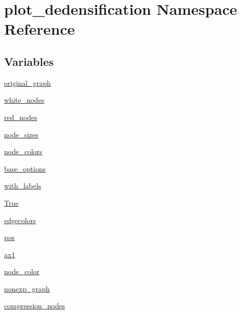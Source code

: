 \hypertarget{namespaceplot__dedensification}{}\section{plot\+\_\+dedensification Namespace Reference}
\label{namespaceplot__dedensification}
\subsection*{Variables}
\begin{DoxyCompactItemize}
\item 
\hyperlink{namespaceplot__dedensification_a3df981aa4bd3d49d35f4da2cef3f77fd}{original\+\_\+graph}
\item 
\hyperlink{namespaceplot__dedensification_a86c711d26d81c22977c43d571fdaf388}{white\+\_\+nodes}
\item 
\hyperlink{namespaceplot__dedensification_af0d2771c2cffab3dd4652f522443b3ce}{red\+\_\+nodes}
\item 
\hyperlink{namespaceplot__dedensification_aa03dbbf327755fab4acd45e1a8381edb}{node\+\_\+sizes}
\item 
\hyperlink{namespaceplot__dedensification_a2d55097eca36c50fa5f7b2bb1beb7bc9}{node\+\_\+colors}
\item 
\hyperlink{namespaceplot__dedensification_ac6788553e8898b5d95e7a0cd26cfeb6d}{base\+\_\+options}
\item 
\hyperlink{namespaceplot__dedensification_ab249ae2e2197f1b32a2ecbc73e1188fa}{with\+\_\+labels}
\item 
\hyperlink{namespaceplot__dedensification_a01a2c64cf693f4eef403ba3b9c96a8d2}{True}
\item 
\hyperlink{namespaceplot__dedensification_a7e45d80e023dd36bb2d873fab58ac9e9}{edgecolors}
\item 
\hyperlink{namespaceplot__dedensification_a1c0b3456a75adce64f746c13e8279c1b}{pos}
\item 
\hyperlink{namespaceplot__dedensification_af97cf6bbfe0e1b03f4b19afbad29853a}{ax1}
\item 
\hyperlink{namespaceplot__dedensification_aa6c742801ba790cacf459e2c1ecf6aee}{node\+\_\+color}
\item 
\hyperlink{namespaceplot__dedensification_a8c99d9ae42527315c10640205165deda}{nonexp\+\_\+graph}
\item 
\hyperlink{namespaceplot__dedensification_a1aa52d25223e99e93164fac43cf3cc22}{compression\+\_\+nodes}
\item 

\end{DoxyCompactItemize}
